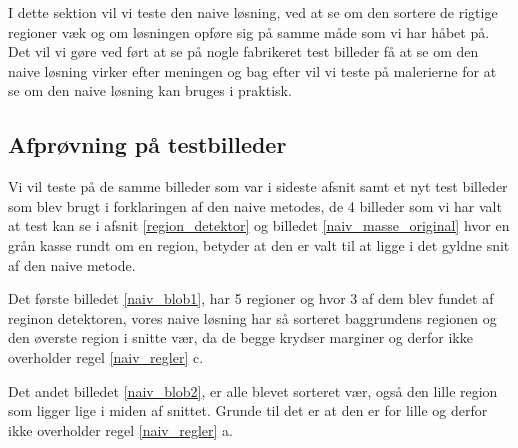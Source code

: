 {\sffamily
I dette sektion vil vi teste den naive løsning, ved at se om den sortere
de rigtige regioner væk og om løsningen opføre sig på samme måde som vi
har håbet på. Det vil vi gøre ved ført at se på nogle fabrikeret test
billeder få at se om den naive løsning virker efter meningen og bag
efter vil vi teste på malerierne for at se om den naive løsning kan
bruges i praktisk.
}
  
\subsection{Afprøvning på testbilleder}
Vi vil teste på de samme billeder som var i sideste afsnit samt et nyt
test billeder som blev brugt i forklaringen af den naive metodes, de 4
billeder som vi har valt at test kan se i afsnit \ref{region_detektor} og billedet 
\ref{naiv_masse_original} hvor en grån kasse rundt om en region, betyder
at den er valt til at ligge i det gyldne snit af den naive metode. 

Det første billedet \ref{naiv_blob1}, har 5
regioner og hvor 3 af dem blev fundet af reginon detektoren, vores naive
løsning har så sorteret baggrundens regionen og den øverste region i
snitte vær, da de begge krydser marginer og derfor ikke overholder regel
\ref{naiv_regler} c. 

\begin{figure}[!h]
    \centering
		\hspace{1em}
\end{figure}

Det andet billedet \ref{naiv_blob2}, er alle blevet
sorteret vær, også den lille region som ligger lige i miden af snittet.
Grunde til det er at den er for lille og derfor ikke overholder regel
\ref{naiv_regler} a. 

